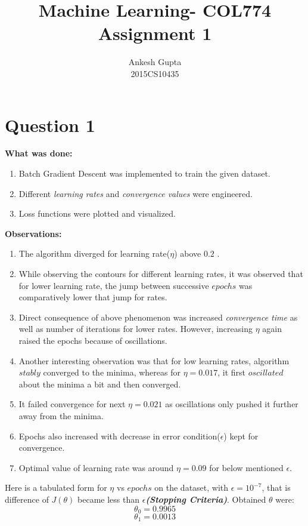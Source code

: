 \documentclass{article}
\newcommand{\bld}[1]{\textbf{#1}}
\newcommand{\ital}[1]{\textit{#1}}
\newcommand{\italb}[1]{\textbf{\textit{#1}}}
\begin{document}
\title{Machine Learning- COL774 \\Assignment 1}
\author{Ankesh Gupta\\2015CS10435}

\date{}
\maketitle

\section*{Question 1}

\bld{What was done:}
\begin{enumerate}
\item Batch Gradient Descent was implemented to train the given dataset.
\item Different \ital{learning rates} and \ital{convergence values} were engineered.
\item Loss functions were plotted and visualized.
\end{enumerate}  
\bld{Observations:}
\begin{enumerate}
\item The algorithm diverged for learning rate($\eta$) above $0.2$ .
\item While observing the contours for different learning rates, it was observed that for lower learning rate, the jump between successive $epochs$ was comparatively lower that jump for rates.
\item Direct consequence of above phenomenon was increased \ital{convergence time} as well as number of iterations for lower rates. However, increasing $\eta$ again raised the epochs because of oscillations.
\item Another interesting observation was that for low learning rates, algorithm $stably$ converged to the minima, whereas for $\eta=0.017$, it first $oscillated$ about the minima a bit and then converged.
\item It failed convergence for next $\eta=0.021$ as oscillations only pushed it further away from the minima.
\item Epochs also increased with decrease in error condition($\epsilon$) kept for convergence.
\item Optimal value of learning rate was around $\eta=0.09$ for below mentioned $\epsilon$.
\end{enumerate}  

Here is a tabulated form for $\eta$ vs $epochs$ on the dataset, with $\epsilon=10^{-7}$, that is difference of $J(\theta)$ became less than $\epsilon$\italb{(Stopping Criteria)}. Obtained $\theta$ were: $$\theta_0 =0.9965$$ $$\theta_1 =0.0013$$
\end{document}
